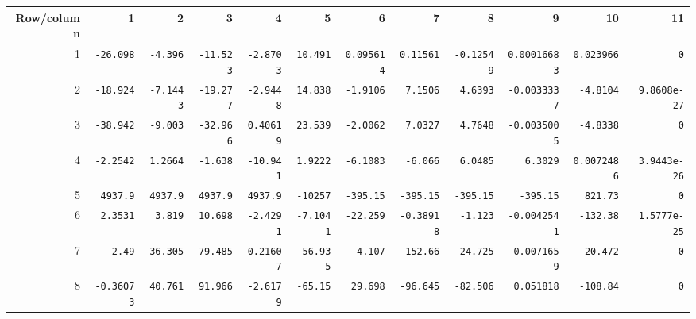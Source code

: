 \begin{landscape}
\begingroup\scriptsize\setlength{\tabcolsep}{3pt}\centering
\begin{tabular}{rrrrrrrrrrrr}\toprule

Row/column & 1 & 2 & 3 & 4 & 5 & 6 & 7 & 8 & 9 & 10 & 11 \\ \midrule

1 & \texttt{-26.098} & \texttt{-4.396} & \texttt{-11.523} & \texttt{-2.8703} & \texttt{10.491} & \texttt{0.095614} & \texttt{0.11561} & \texttt{-0.12549} & \texttt{0.00016683} & \texttt{0.023966} & \texttt{0} \\

2 & \texttt{-18.924} & \texttt{-7.1443} & \texttt{-19.277} & \texttt{-2.9448} & \texttt{14.838} & \texttt{-1.9106} & \texttt{7.1506} & \texttt{4.6393} & \texttt{-0.0033337} & \texttt{-4.8104} & \texttt{9.8608e-27} \\

3 & \texttt{-38.942} & \texttt{-9.003} & \texttt{-32.966} & \texttt{0.40619} & \texttt{23.539} & \texttt{-2.0062} & \texttt{7.0327} & \texttt{4.7648} & \texttt{-0.0035005} & \texttt{-4.8338} & \texttt{0} \\

4 & \texttt{-2.2542} & \texttt{1.2664} & \texttt{-1.638} & \texttt{-10.941} & \texttt{1.9222} & \texttt{-6.1083} & \texttt{-6.066} & \texttt{6.0485} & \texttt{6.3029} & \texttt{0.0072486} & \texttt{3.9443e-26} \\

5 & \texttt{4937.9} & \texttt{4937.9} & \texttt{4937.9} & \texttt{4937.9} & \texttt{-10257} & \texttt{-395.15} & \texttt{-395.15} & \texttt{-395.15} & \texttt{-395.15} & \texttt{821.73} & \texttt{0} \\

6 & \texttt{2.3531} & \texttt{3.819} & \texttt{10.698} & \texttt{-2.4291} & \texttt{-7.1041} & \texttt{-22.259} & \texttt{-0.38918} & \texttt{-1.123} & \texttt{-0.0042541} & \texttt{-132.38} & \texttt{1.5777e-25} \\

7 & \texttt{-2.49} & \texttt{36.305} & \texttt{79.485} & \texttt{0.21607} & \texttt{-56.935} & \texttt{-4.107} & \texttt{-152.66} & \texttt{-24.725} & \texttt{-0.0071659} & \texttt{20.472} & \texttt{0} \\

8 & \texttt{-0.36073} & \texttt{40.761} & \texttt{91.966} & \texttt{-2.6179} & \texttt{-65.15} & \texttt{29.698} & \texttt{-96.645} & \texttt{-82.506} & \texttt{0.051818} & \texttt{-108.84} & \texttt{0} \\


\end{tabular}
\end{landscape}
